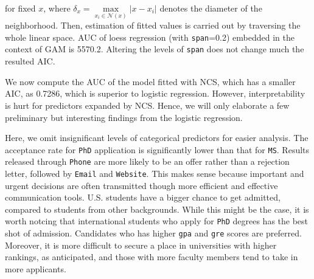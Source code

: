 for fixed $x$, where $\delta_x=\underset{x_i\in \mathcal{N}(x)}{\max}|x-x_i|$ denotes the diameter of the neighborhood. Then, estimation of fitted values is carried out by traversing the whole linear space. AUC of loess regression (with \texttt{span}=0.2) embedded in the context of GAM is 5570.2. Altering the levels of \texttt{span} does not change much the resulted AIC.
\par We now compute the AUC of the model fitted with NCS, which has a smaller AIC, as 0.7286, which is superior to logistic regression. However, interpretability is hurt for predictors expanded by NCS. Hence, we will only elaborate a few preliminary but interesting findings from the logistic regression. 
\par Here, we omit insignificant levels of categorical predictors for easier analysis. The acceptance rate for \texttt{PhD} application is significantly lower than that for \texttt{MS}. Results released through \texttt{Phone} are more likely to be an offer rather than a rejection letter, followed by \texttt{Email} and \texttt{Website}. This makes sense because important and urgent decisions are often transmitted though more efficient and effective communication tools. U.S. students have a bigger chance to get admitted, compared to students from other backgrounds. While this might be the case, it is worth notcing that international students who apply for \texttt{PhD} degrees has the best shot of admission. Candidates who has higher \texttt{gpa} and \texttt{gre} scores are preferred. Moreover, it is more difficult to secure a place in universities with higher rankings, as anticipated, and those with more faculty members tend to take in more applicants.
